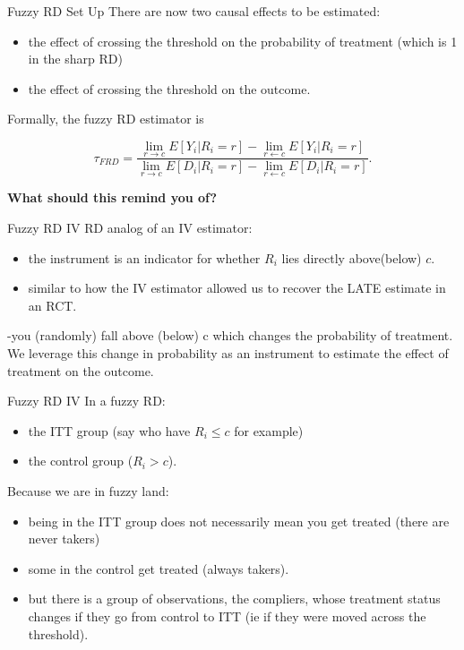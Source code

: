 \documentclass[
  ignorenonframetext,
]{beamer}
\begin{document}
\begin{frame}{Fuzzy RD Set Up}
\protect\hypertarget{fuzzy-rd-set-up-1}{}
There are now two causal effects to be estimated:

\begin{itemize}
\item
  the effect of crossing the threshold on the probability of treatment
  (which is 1 in the sharp RD)
\item
  the effect of crossing the threshold on the outcome.
\end{itemize}

Formally, the fuzzy RD estimator is

\[
\tau_{FRD}=\frac{\lim\limits_{r\rightarrow c} E[Y_i|R_i=r]-\lim\limits_{r\leftarrow c}E[Y_i|R_i=r]}{\lim\limits_{r\rightarrow c} E[D_i|R_i=r]-\lim\limits_{r\leftarrow c}E[D_i|R_i=r]}.
\]

\textbf{What should this remind you of?}
\end{frame}

\begin{frame}{Fuzzy RD IV}
\protect\hypertarget{fuzzy-rd-iv}{}
RD analog of an IV estimator:

\begin{itemize}
\item
  the instrument is an indicator for whether \(R_i\) lies directly
  above(below) \(c\).
\item
  similar to how the IV estimator allowed us to recover the LATE
  estimate in an RCT.
\end{itemize}

-you (randomly) fall above (below) c which changes the probability of
treatment. We leverage this change in probability as an instrument to
estimate the effect of treatment on the outcome.
\end{frame}

\begin{frame}{Fuzzy RD IV}
\protect\hypertarget{fuzzy-rd-iv-1}{}
In a fuzzy RD:

\begin{itemize}
\item
  the ITT group (say who have \(R_i\leq c\) for example)
\item
  the control group (\(R_i>c\)).
\end{itemize}

Because we are in fuzzy land:

\begin{itemize}
\item
  being in the ITT group does not necessarily mean you get treated
  (there are never takers)
\item
  some in the control get treated (always takers).
\item
  but there is a group of observations, the compliers, whose treatment
  status changes if they go from control to ITT (ie if they were moved
  across the threshold).
\end{itemize}
\end{frame}
\end{document}
